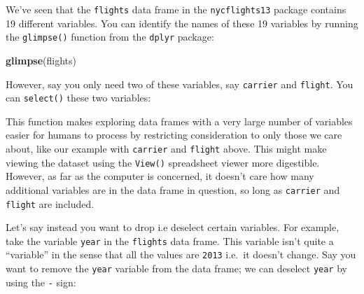\documentclass[12pt, krantz2,]{krantz}
\makeatletter
\newenvironment{Shaded}{\begin{snugshade}}{\end{snugshade}}
\newcommand{\KeywordTok}[1]{\textcolor[rgb]{0.27,0.27,0.27}{\textbf{#1}}}
\newcommand{\NormalTok}[1]{#1}
\newcommand{\OperatorTok}[1]{\textcolor[rgb]{0.43,0.43,0.43}{\textbf{#1}}}
\newcommand{\StringTok}[1]{\textcolor[rgb]{0.5,0.5,0.5}{#1}}
\newenvironment{kframe}{%
\medskip{}
\setlength{\fboxsep}{.8em}
 \def\at@end@of@kframe{}%
 \ifinner\ifhmode%
  \def\at@end@of@kframe{\end{minipage}}%
  \begin{minipage}{\columnwidth}%
 \fi\fi%
 \def\FrameCommand##1{\hskip\@totalleftmargin \hskip-\fboxsep
 \colorbox{shadecolor}{##1}\hskip-\fboxsep
     \hskip-\linewidth \hskip-\@totalleftmargin \hskip\columnwidth}%
 \MakeFramed {\advance\hsize-\width
   \@totalleftmargin\z@ \linewidth\hsize
   \@setminipage}}%
 {\par\unskip\endMakeFramed%
 \at@end@of@kframe}
\renewenvironment{Shaded}{\begin{kframe}}{\end{kframe}}
\makeatother
\begin{document}
We've seen that the \texttt{flights} data frame in the \texttt{nycflights13} package contains 19 different variables. You can identify the names of these 19 variables by running the \texttt{glimpse()} function from the \texttt{dplyr} package:

\begin{Shaded}
\begin{Highlighting}[]
\KeywordTok{glimpse}\NormalTok{(flights)}
\end{Highlighting}
\end{Shaded}

However, say you only need two of these variables, say \texttt{carrier} and \texttt{flight}. You can \texttt{select()} these two variables:

\begin{Shaded}
\end{Shaded}

This function makes exploring data frames with a very large number of variables easier for humans to process by restricting consideration to only those we care about, like our example with \texttt{carrier} and \texttt{flight} above. This might make viewing the dataset using the \texttt{View()} spreadsheet viewer more digestible. However, as far as the computer is concerned, it doesn't care how many additional variables are in the data frame in question, so long as \texttt{carrier} and \texttt{flight} are included.

Let's say instead you want to drop i.e deselect certain variables. For example, take the variable \texttt{year} in the \texttt{flights} data frame. This variable isn't quite a ``variable'' in the sense that all the values are \texttt{2013} i.e.~it doesn't change. Say you want to remove the \texttt{year} variable from the data frame; we can deselect \texttt{year} by using the \texttt{-} sign:

\begin{Shaded}
\end{Shaded}
\end{document}
